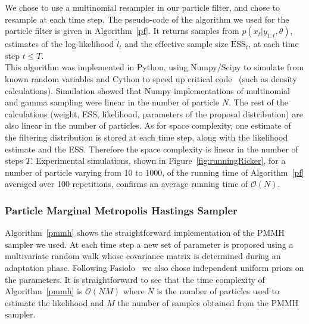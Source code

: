 \documentclass[12pt]{article}
\begin{document}
	We chose to use a multinomial resampler in our particle filter, and chose to resample at each time step. The pseudo-code of the algorithm we used for the particle filter is given in Algorithm~\ref{pf}. It returns samples from $p(x_t | y_{1:t}, \theta)$, estimates of the log-likelihood $\hat{l}_t$ and the effective sample size $\mathrm{ESS}_t$, at each time step $t \le T$. \\
	This algorithm was implemented in Python, using Numpy/Scipy to simulate from known random variables and Cython to speed up critical code~\cite{wilbers2009using, behnel2011cython} (such as density calculations). Simulation showed that Numpy implementations of multinomial and gamma sampling were linear in the number of particle $N$. The rest of the calculations (weight, ESS, likelihood, parameters of the proposal distribution) are also linear in the number of particles. As for space complexity, one estimate of the filtering distribution is stored at each time step, along with the likelihood estimate and the ESS. Therefore the space complexity is linear in the number of steps $T$. Experimental simulations, shown in Figure~\ref{fig:runningRicker}, for a number of particle varying from 10 to 1000, of the running time of Algorithm~\ref{pf} averaged over 100 repetitions, confirms an average running time of $\mathcal{O}(N)$.
	
	\subsubsection{Particle Marginal Metropolis Hastings Sampler}
	Algorithm~\ref{pmmh} shows the straightforward implementation of the PMMH sampler we used. At each time step a new set of parameter is proposed using a multivariate random walk whose covariance matrix is determined during an adaptation phase. Following Fasiolo~\cite{fasiolo2014statistical} we also chose independent uniform priors on the parameters. It is straightforward to see that the time complexity of Algorithm~\ref{pmmh} is $\mathcal{O}(NM)$ where $N$ is the number of particles used to estimate the likelihood and $M$ the number of samples obtained from the PMMH sampler.
	
\end{document}
